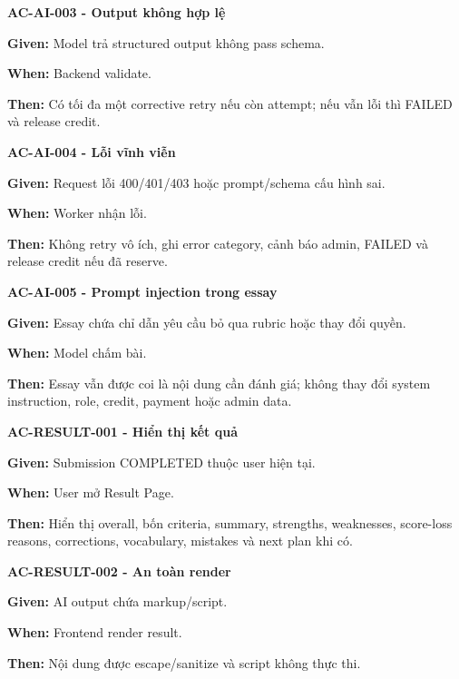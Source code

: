 \documentclass[11pt,a4paper]{article}
\begin{document}
\begin{acceptancebox}
\textbf{AC-AI-003 - Output không hợp lệ}\par
\textbf{Given:} Model trả structured output không pass schema.\par
\textbf{When:} Backend validate.\par
\textbf{Then:} Có tối đa một corrective retry nếu còn attempt; nếu vẫn lỗi thì FAILED và release credit.
\end{acceptancebox}

\begin{acceptancebox}
\textbf{AC-AI-004 - Lỗi vĩnh viễn}\par
\textbf{Given:} Request lỗi 400/\allowbreak{}401/\allowbreak{}403 hoặc prompt/\allowbreak{}schema cấu hình sai.\par
\textbf{When:} Worker nhận lỗi.\par
\textbf{Then:} Không retry vô ích, ghi error category, cảnh báo admin, FAILED và release credit nếu đã reserve.
\end{acceptancebox}

\begin{acceptancebox}
\textbf{AC-AI-005 - Prompt injection trong essay}\par
\textbf{Given:} Essay chứa chỉ dẫn yêu cầu bỏ qua rubric hoặc thay đổi quyền.\par
\textbf{When:} Model chấm bài.\par
\textbf{Then:} Essay vẫn được coi là nội dung cần đánh giá; không thay đổi system instruction, role, credit, payment hoặc admin data.
\end{acceptancebox}

\begin{acceptancebox}
\textbf{AC-RESULT-001 - Hiển thị kết quả}\par
\textbf{Given:} Submission COMPLETED thuộc user hiện tại.\par
\textbf{When:} User mở Result Page.\par
\textbf{Then:} Hiển thị overall, bốn criteria, summary, strengths, weaknesses, score-loss reasons, corrections, vocabulary, mistakes và next plan khi có.
\end{acceptancebox}

\begin{acceptancebox}
\textbf{AC-RESULT-002 - An toàn render}\par
\textbf{Given:} AI output chứa markup/\allowbreak{}script.\par
\textbf{When:} Frontend render result.\par
\textbf{Then:} Nội dung được escape/\allowbreak{}sanitize và script không thực thi.
\end{acceptancebox}
\end{document}
